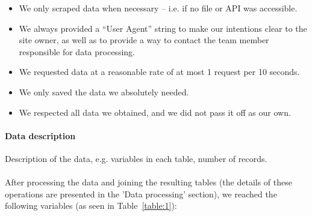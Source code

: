 \documentclass[11pt,a4paper]{article}
\begin{document}
\begin{itemize}
    \item We only scraped data when necessary – i.e. if no file or API was accessible.
    \item We always provided a “User Agent” string to make our intentions clear to the site owner, as well as to provide a way to contact the team member responsible for data processing.
    \item We requested data at a reasonable rate of at most 1 request per 10 seconds.
    \item We only saved the data we absolutely needed.
    \item We respected all data we obtained, and we did not pass it off as our own.
\end{itemize}

\paragraph{Data description} Description of the data, e.g. variables
in each table, number of records. \\ \\
After processing the data and joining the resulting tables (the details of these operations are presented in the 'Data processing' section), we reached the following variables (as seen in Table~\ref{table:1}):
\end{document}
